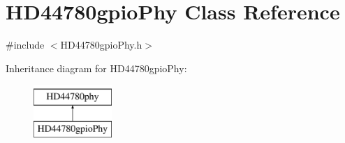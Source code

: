 \hypertarget{class_h_d44780gpio_phy}{\section{H\-D44780gpio\-Phy Class Reference}
\label{class_h_d44780gpio_phy}
}


{\ttfamily \#include $<$H\-D44780gpio\-Phy.\-h$>$}

Inheritance diagram for H\-D44780gpio\-Phy\-:\begin{figure}[H]
\begin{center}
\leavevmode
\includegraphics[height=2.000000cm]{class_h_d44780gpio_phy}
\end{center}
\end{figure}
